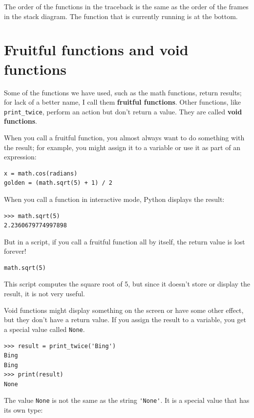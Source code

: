 \documentclass[10pt]{book}
\begin{document}
The order of the functions in the traceback is the same as the
order of the frames in the stack diagram.  The function that is
currently running is at the bottom.


\section{Fruitful functions and void functions}

Some of the functions we have used, such as the math functions, return
results; for lack of a better name, I call them {\bf fruitful
  functions}.  Other functions, like \verb"print_twice", perform an
action but don't return a value.  They are called {\bf void
  functions}.

When you call a fruitful function, you almost always
want to do something with the result; for example, you might
assign it to a variable or use it as part of an expression:

\begin{verbatim}
x = math.cos(radians)
golden = (math.sqrt(5) + 1) / 2
\end{verbatim}
%
When you call a function in interactive mode, Python displays
the result:

\begin{verbatim}
>>> math.sqrt(5)
2.2360679774997898
\end{verbatim}
%
But in a script, if you call a fruitful function all by itself,
the return value is lost forever!

\begin{verbatim}
math.sqrt(5)
\end{verbatim}
%
This script computes the square root of 5, but since it doesn't store
or display the result, it is not very useful.

Void functions might display something on the screen or have some
other effect, but they don't have a return value.  If you
assign the result to a variable, you get a special value called
{\tt None}.

\begin{verbatim}
>>> result = print_twice('Bing')
Bing
Bing
>>> print(result)
None
\end{verbatim}
%
The value {\tt None} is not the same as the string \verb"'None'".
It is a special value that has its own type:
\end{document}
